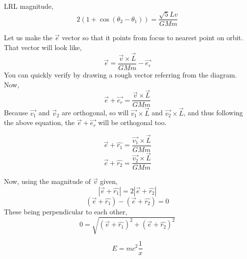 \documentclass[11pt,a4paper]{article}
\begin{document}
{{{LRL magnitude,
\[ 
    2\left( 1 + \cos\left( \theta_2 - \theta_1 \right)  \right) = \frac{\sqrt{5} Lv}{GMm}
\]
}}

Let us make the $\vec{e}$ vector so that it points from focus to nearest point on orbit. That vector will look like,
\[ 
\vec{e} = \frac{\vec{v} \times  \vec{L}}{ GMm} - \vec{e_r}
\]
You can quickly verify by drawing a rough vector referring from the diagram. Now,
\[ 
\vec{e} + \vec{e_r} = \frac{\vec{v} \times \vec{L}}{GMm} 
\]
Because $\vec{v_1}$ and $\vec{v}_2$ are orthogonal, so will $\vec{v_1}\times \vec{L}$ and $\vec{v_2}\times \vec{L}$, and thus following the above equation, the $\vec{e}+\vec{e_r}$ will  be orthogonal too. 

\[ 
\vec{e} + \hat{r_1} = \frac{\vec{v_1} \times  \vec{L}}{GMm}
\]
\[ 
\vec{e} + \hat{r_2} = \frac{\vec{v_2} \times  \vec{L}}{GMm}
\]

Now, using the magnitude of $\vec{v}$ given,
\[ 
|\vec{e} + \hat{r_1} |=2 | \vec{e} + \hat{r_2}| 
\]
\[ 
    \left( \vec{e} + \hat{r_1}  \right) - \left( \vec{e} + \hat{r_2} \right)  =0
\]
These being perpendicular to each other,
\[ 
    0 = \sqrt{ \left( \vec{e}+\hat{r_1} \right)^2 + \left( \vec{e} + \hat{r_2} \right)  ^2} 
\]

}

\[ 
E  = mc^2 \frac{1}{x}
\]
\end{document}
